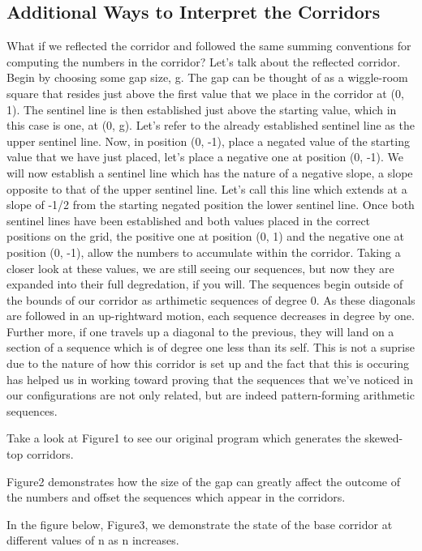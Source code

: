 \documentclass{article}
\begin{document}
\subsection{Additional Ways to Interpret the Corridors}
What if we reflected the corridor and followed the same summing conventions for computing the numbers in the corridor? 
Let's talk about the reflected corridor. Begin by choosing some gap size, g. The gap can be thought of as a wiggle-room square that resides just above the first value that we place in the
corridor at (0, 1). The sentinel line is then established just above the starting value, which in this case is one, at (0, g). Let's refer to the already established sentinel line as the upper sentinel line. 
Now, in position (0, -1), place a negated value of the starting value that we have just placed, let's place a negative one at position (0, -1). We will now establish a sentinel line which has the nature 
of a negative slope, a slope opposite to that of the upper sentinel line. Let's call this line which extends at a slope of -1/2 from the starting negated position the lower sentinel line. Once both sentinel lines 
have been established and both values placed in the correct positions on the grid, the positive one at position (0, 1) and the negative one at position (0, -1), allow the numbers to accumulate within the corridor. 
Taking a closer look at these values, we are still seeing our sequences, but now they are expanded into their full degredation, if you will. The sequences begin outside of the bounds of our corridor as arthimetic sequences
of degree 0. As these diagonals are followed in an up-rightward motion, each sequence decreases in degree by one. Further more, if one travels up a diagonal to the previous, they will land on a section of a sequence which 
is of degree one less than its self. This is not a suprise due to the nature of how this corridor is set up and the fact that this is occuring has helped us in working toward proving that the sequences that we've noticed 
in our configurations are not only related, but are indeed pattern-forming arithmetic sequences.

Take a look at Figure1 to see our original program which generates the skewed-top corridors. 

Figure2 demonstrates how the size of the gap can greatly affect the outcome of the numbers and offset the sequences which appear in the corridors. 

In the figure below, Figure3, we demonstrate the state of the base corridor at different values of n as n increases. 
\end{document}
